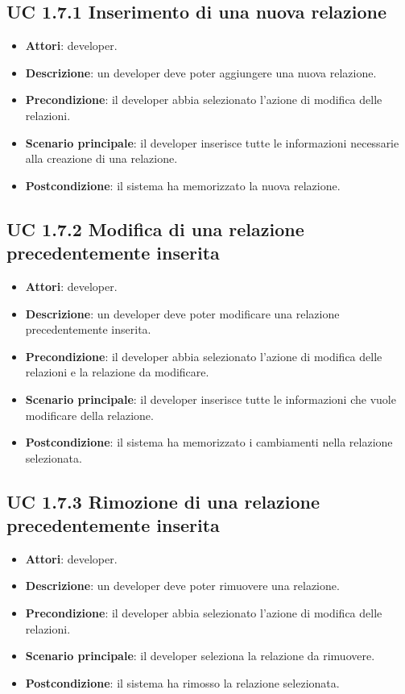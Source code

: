 	\subsection{UC 1.7.1 Inserimento di una nuova relazione}
		\label{subsec:XEUC1.7.1}
		
		\begin{itemize}
			\item\textbf{Attori}: developer.
			\item\textbf{Descrizione}: un developer deve poter aggiungere una nuova relazione.
			\item\textbf{Precondizione}: il developer abbia selezionato l'azione di modifica delle relazioni.
			\item\textbf{Scenario principale}: il developer inserisce tutte le informazioni necessarie alla creazione di una relazione.
			\item\textbf{Postcondizione}: il sistema ha memorizzato la nuova relazione.
		\end{itemize}
		
	\subsection{UC 1.7.2 Modifica di una relazione precedentemente inserita}
		\label{subsec:XEUC1.7.2}
		
		\begin{itemize}
			\item\textbf{Attori}: developer.
			\item\textbf{Descrizione}: un developer deve poter modificare una relazione precedentemente inserita.
			\item\textbf{Precondizione}: il developer abbia selezionato l'azione di modifica delle relazioni e la relazione da modificare.
			\item\textbf{Scenario principale}: il developer inserisce tutte le informazioni che vuole modificare della relazione.
			\item\textbf{Postcondizione}: il sistema ha memorizzato i cambiamenti nella relazione selezionata.
		\end{itemize}
		
	\subsection{UC 1.7.3 Rimozione di una relazione precedentemente inserita}
		\label{subsec:XEUC1.6.3}
		
		\begin{itemize}
			\item\textbf{Attori}: developer.
			\item\textbf{Descrizione}: un developer deve poter rimuovere una relazione.
			\item\textbf{Precondizione}: il developer abbia selezionato l'azione di modifica delle relazioni.
			\item\textbf{Scenario principale}: il developer seleziona la relazione da rimuovere.
			\item\textbf{Postcondizione}: il sistema ha rimosso la relazione selezionata.
		\end{itemize}
		
